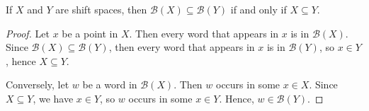 \documentclass[hidelinks]{article}
\newcommand{\Lc}{\mathcal{L}}  %
\newcommand{\Gc}{\mathcal{G}}  %
\newcommand{\Hc}{\mathcal{H}}  %
\newcommand{\Ec}{\mathcal{E}}
\newcommand{\Bc}{\mathcal{B}}
\newcommand{\shift}[1]{\mathsf{X}_{#1}}
\theoremstyle{definition}
\begin{document}
        




    \begin{lemma}
        If \(X\) and \(Y\) are shift spaces, then \(\Bc(X) \subseteq \Bc(Y)\) if and only if \(X \subseteq Y\).
    \end{lemma}

    \begin{proof}
        Let \(x\) be a point in \(X\). Then every word that appears in \(x\) is in \(\Bc(X)\). Since 
        \(\Bc(X) \subseteq \Bc(Y)\), then every word that appears in \(x\) is in \(\Bc(Y)\),
        so \(x \in Y\), hence \(X \subseteq Y\).

        Conversely, let \(w\) be a word in \(\Bc(X)\). Then \(w\) occurs in some \(x \in X\). 
        Since \(X \subseteq Y\), we have \(x \in Y\), so \(w\) occurs in some \(x \in Y\). Hence, \(w \in \Bc(Y)\).
    \end{proof}
\end{document}
